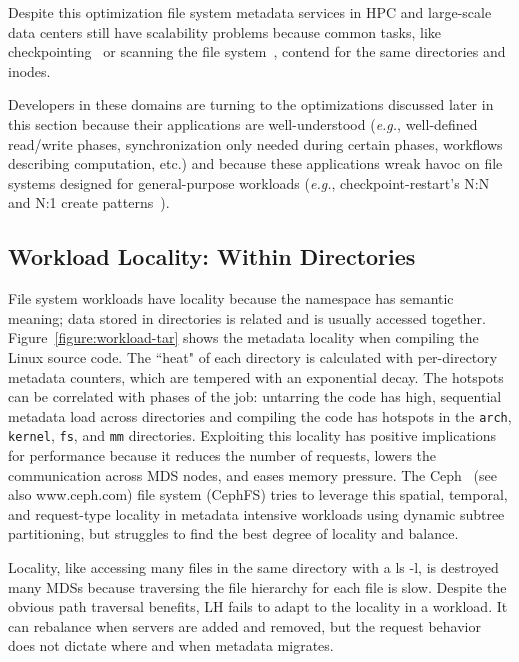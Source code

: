 Despite this optimization file system metadata services in HPC and large-scale
data centers still have scalability problems because common tasks, like
checkpointing~\cite{bent_plfs_2009} or scanning the file
system~\cite{zheng:pdsw2014-batchfs}, contend for the same directories and
inodes.

Developers in these domains are turning to the optimizations discussed later in
this section because their applications are well-understood ({\it e.g.},
well-defined read/write phases, synchronization only needed during certain
phases, workflows describing computation, etc.) and because these applications
wreak havoc on file systems designed for general-purpose workloads ({\it e.g.},
checkpoint-restart's N:N and N:1 create patterns~\cite{bent_plfs_2009}).

\subsection{Workload Locality: Within Directories}

File system workloads have locality because the namespace has semantic meaning;
data stored in directories is related and is usually accessed together.
Figure~\ref{figure:workload-tar} shows the metadata locality when compiling the
Linux source code. The ``heat" of each directory is calculated with
per-directory metadata counters, which are tempered with an exponential decay.
The hotspots can be correlated with phases of the job: untarring the code has
high, sequential metadata load across directories and compiling the code has
hotspots in the \texttt{arch}, \texttt{kernel}, \texttt{fs}, and \texttt{mm}
directories. Exploiting this locality has positive implications for performance
because it reduces the number of requests, lowers the communication across MDS
nodes, and eases memory pressure. The Ceph~\cite{weil:osdi2006-ceph} (see also
www.ceph.com) file system (CephFS) tries to leverage this spatial, temporal,
and request-type locality in metadata intensive workloads using dynamic subtree
partitioning, but struggles to find the best degree of locality and balance.

Locality, like accessing many files in the same directory with a ls -l, is
destroyed many MDSs because traversing the file hierarchy for each file is
slow. Despite the obvious path traversal benefits, LH fails to adapt to the
locality in a workload. It can rebalance when servers are added and removed,
but the request behavior does not dictate where and when metadata migrates.

